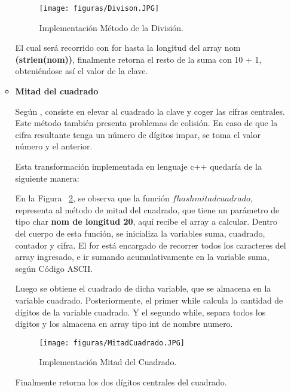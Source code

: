 \documentclass[10pt,conference]{IEEEtran}
\begin{document}
\begin{enumerate}[]
\begin{itemize}
        \begin{figure}[H]
        \begin{center}
            \texttt{[image: figuras/Divison.JPG]}
            \caption{Implementación Método de la División.}
            \label{divi} 
        \end{center}
        \end{figure}

         El cual será recorrido con for hasta la longitud del array nom \textbf{(strlen(nom))}, finalmente retorna el resto de la suma con 10 + 1, obteniéndose así el valor de la clave.
        
        \item {\textbf{Mitad del cuadrado}}
        \par Según \citep{wiki}, consiste en elevar al cuadrado la clave y coger las cifras centrales. Este método también presenta problemas de colisión. En caso de que la cifra resultante tenga un número de dígitos impar, se toma el valor número y el anterior.
        
        Esta transformación implementada en lenguaje c++ quedaría de la siguiente manera:
        
        En la Figura ~\ref{mitad}, se observa que la función $fhash mitad cuadrado$, representa al método de mitad del cuadrado, que tiene un parámetro de tipo char \textbf{nom de longitud 20}, aquí recibe el array a calcular. Dentro del cuerpo de esta función, se inicializa la variables suma, cuadrado, contador y cifra. El for está encargado de recorrer todos los caracteres del array ingresado, e ir sumando acumulativamente en la variable suma, según Código ASCII. 
        
        Luego se obtiene el cuadrado de dicha variable, que se almacena en la variable cuadrado.
        Posteriormente, el primer while calcula la cantidad de dígitos de la variable cuadrado. Y el segundo while, separa todos los dígitos y los almacena en array tipo int de nombre numero.
        
        \begin{figure}[H]
        \begin{center}
            \texttt{[image: figuras/MitadCuadrado.JPG]}
            \caption{Implementación Mitad del Cuadrado.}
            \label{mitad} 
        \end{center}
        \end{figure}
        
        Finalmente retorna los dos dígitos centrales del cuadrado.
        

\end{itemize}
\end{enumerate}
\end{document}
